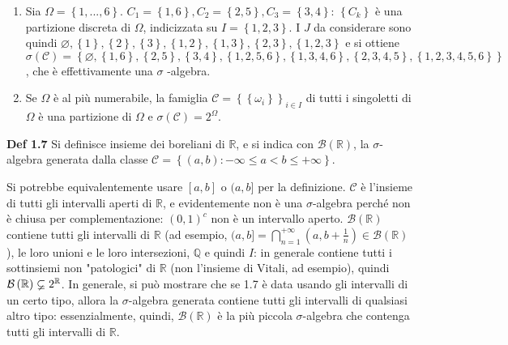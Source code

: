 \documentclass{article}
\begin{document}
\begin{enumerate}
\item Sia $\Omega =\left\{ 1,...,6\right\} $. $C_{1}=\left\{ 1,6\right\}
,C_{2}=\left\{ 2,5\right\} ,C_{3}=\left\{ 3,4\right\} $: $\left\{
C_{k}\right\} $ \`{e} una partizione discreta di $\Omega $, indicizzata su $%
I=\left\{ 1,2,3\right\} $. I $J$ da considerare sono quindi $\varnothing
,\left\{ 1\right\} ,\left\{ 2\right\} ,\left\{ 3\right\} ,\left\{
1,2\right\} ,\left\{ 1,3\right\} ,\left\{ 2,3\right\} ,\left\{ 1,2,3\right\} 
$ e si ottiene $\sigma \left( \mathcal{C}\right) =\left\{ \varnothing
,\left\{ 1,6\right\} ,\left\{ 2,5\right\} ,\left\{ 3,4\right\} ,\left\{
1,2,5,6\right\} ,\left\{ 1,3,4,6\right\} ,\left\{ 2,3,4,5\right\} ,\left\{
1,2,3,4,5,6\right\} \right\} $, che \`{e} effettivamente una $\sigma $%
-algebra.

\item Se $\Omega $ \`{e} al pi\`{u} numerabile, la famiglia $\mathcal{C}%
=\left\{ \left\{ \omega _{i}\right\} \right\} _{i\in I}$ di tutti i
singoletti di $\Omega $ \`{e} una partizione di $\Omega $ e $\sigma \left( 
\mathcal{C}\right) =2^{\Omega }$.
\end{enumerate}

\textbf{Def 1.7} Si definisce insieme dei boreliani di $%
\mathbb{R}
$, e si indica con $\mathcal{B}\left( 
\mathbb{R}
\right) $, la $\sigma $-algebra generata dalla classe $\mathcal{C}=\left\{
\left( a,b\right) :-\infty \leq a<b\leq +\infty \right\} $.

Si potrebbe equivalentemente usare $\left[ a,b\right] $ o $(a,b]$ per la
definizione. $\mathcal{C}$ \`{e} l'insieme di tutti gli intervalli aperti di 
$%
\mathbb{R}
$, e evidentemente non \`{e} una $\sigma $-algebra perch\'{e} non \`{e}
chiusa per complementazione: $\left( 0,1\right) ^{c}$ non \`{e} un
intervallo aperto. $\mathcal{B}\left( 
\mathbb{R}
\right) $ contiene tutti gli intervalli di $%
\mathbb{R}
$ (ad esempio, $(a,b]=\bigcap_{n=1}^{+\infty }\left( a,b+\frac{1}{n}\right)
\in \mathcal{B}\left( 
\mathbb{R}
\right) $), le loro unioni e le loro intersezioni, $%
\mathbb{Q}
$ e quindi $I$: in generale contiene tutti i sottinsiemi non "patologici" di 
$%
\mathbb{R}
$ (non l'insieme di Vitali, ad esempio), quindi $\mathcal{B}\left( 
\mathbb{R}
\right) \varsubsetneq 2^{%
\mathbb{R}
}$. In generale, si pu\`{o} mostrare che se 1.7 \`{e} data usando gli
intervalli di un certo tipo, allora la $\sigma $-algebra generata contiene
tutti gli intervalli di qualsiasi altro tipo: essenzialmente, quindi, $%
\mathcal{B}\left( 
\mathbb{R}
\right) $ \`{e} la pi\`{u} piccola $\sigma $-algebra che contenga tutti gli
intervalli di $%
\mathbb{R}
$.
\end{document}
